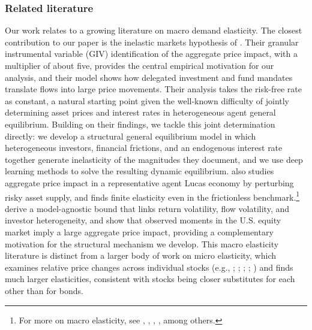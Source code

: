 \documentclass[12pt,english]{article}
\begin{document}
\subsubsection*{Related literature}
Our work relates to a growing literature on macro demand elasticity.
The closest contribution to our paper is the inelastic markets hypothesis of \citet{gabaix2020search}.
Their granular instrumental variable (GIV) identification of the aggregate price impact, with a multiplier of about five, provides the central empirical motivation for our analysis, and their model shows how delegated investment and fund mandates translate flows into large price movements.
Their analysis takes the risk-free rate as constant, a natural starting point given the well-known difficulty of jointly determining asset prices and interest rates in heterogeneous agent general equilibrium.
Building on their findings, we tackle this joint determination directly: we develop a structural general equilibrium model in which heterogeneous investors, financial frictions, and an endogenous interest rate together generate inelasticity of the magnitudes they document, and we use deep learning methods to solve the resulting dynamic equilibrium.
\citet{johnson2006dynamic} also studies aggregate price impact in a representative agent Lucas economy by perturbing risky asset supply, and finds finite elasticity even in the frictionless benchmark.\footnote{For more on macro elasticity, see \cite{johnson2008volume,johnson2009liquid}, \cite{Deuskar/Johnson/2011}, \cite{Li/Pearson/Zhang/2020}, \cite{Hartzmark/Solomon/2021}, among others.}
\citet{vanderbeck2026bound} derive a model-agnostic bound that links return volatility, flow volatility, and investor heterogeneity, and show that observed moments in the U.S. equity market imply a large aggregate price impact, providing a complementary motivation for the structural mechanism we develop.
This macro elasticity literature is distinct from a larger body of work on micro elasticity, which examines relative price changes across individual stocks (e.g., \citealp{Shleifer/1986}; \citealp{Harris/Gurel/1986}; \citealp{chang2015regression}; \citealp{pavlova2021benchmarking}; \citealp{Schmickler/2020}) and finds much larger elasticities, consistent with stocks being closer substitutes for each other than for bonds.
\end{document}
